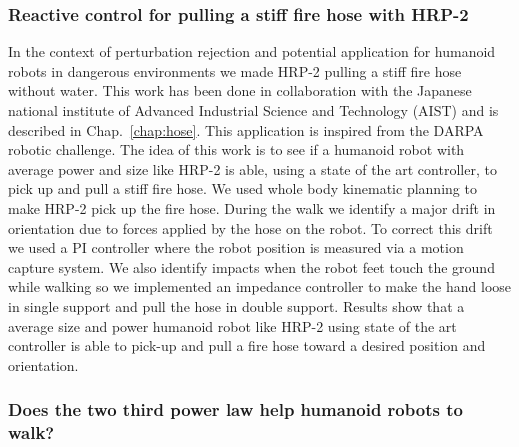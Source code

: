 \subsubsection*{Reactive control for pulling a stiff fire hose with HRP-2}

In the context of perturbation rejection and potential application for humanoid robots in dangerous environments we made HRP-2 pulling a stiff fire hose without water.
This work has been done in collaboration with the Japanese national institute of Advanced Industrial Science and Technology (AIST) and is described in Chap.~\ref{chap:hose}.
This application is inspired from the DARPA robotic challenge.
The idea of this work is to see if a humanoid robot with average power and size like HRP-2 is able, using a state of the art controller, to pick up and pull a stiff fire hose.
We used whole body kinematic planning to make HRP-2 pick up the fire hose.
During the walk we identify a major drift in orientation due to forces applied by the hose on the robot.
To correct this drift we used a PI controller where the robot position is measured via a motion capture system.
We also identify impacts when the robot feet touch the ground while walking so we implemented an impedance controller to make the hand loose in single support and pull the hose in double support.
Results show that a average size and power humanoid robot like HRP-2 using state of the art controller is able to pick-up and pull a fire hose toward a desired position and orientation.

\subsubsection*{Does the two third power law help humanoid robots to walk?}

